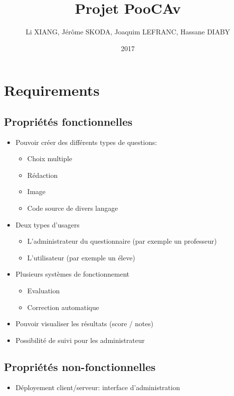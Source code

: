 \documentclass[12pt]{article}
\title{Projet PooCAv}
\author{Li XIANG, Jérôme SKODA, Joaquim LEFRANC, Hassane DIABY}
\date{2017}
\begin{document}
\maketitle
\section{Requirements}

\subsection{Propriétés fonctionnelles}
\begin{itemize}
  \item Pouvoir créer des différents types de questions:
    \begin{itemize}
      \item Choix multiple
      \item Rédaction
      \item Image
      \item Code source de divers langage
    \end{itemize}
  \item Deux types d'usagers
    \begin{itemize}
      \item L'administrateur du questionnaire (par exemple un professeur)
      \item L'utilisateur (par exemple un éleve)
    \end{itemize}
  \item Plusieurs systèmes de fonctionnement
    \begin{itemize}
      \item Evaluation
      \item Correction automatique
    \end{itemize}
  \item Pouvoir visualiser les résultats (score / notes)
  \item Possibilité de suivi pour les administrateur
\end{itemize}

\subsection{Propriétés non-fonctionnelles}
\begin{itemize}
  \item Déployement client/serveur: interface d'administration
\end{itemize}
\end{document}
